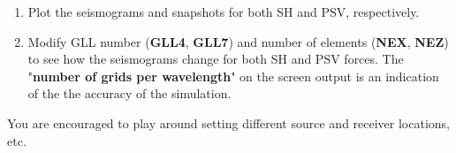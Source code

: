 \documentclass[11pt,titlepage,fleqn]{article}
\begin{document}
\begin{enumerate}

\item Plot the seismograms and snapshots for both SH and PSV, respectively.

\item Modify GLL number ({\bf GLL4}, {\bf GLL7}) and number of elements ({\bf NEX}, {\bf NEZ}) to see how the seismograms change for both SH and
PSV forces. The "{\bf number of grids per wavelength}" on the screen output is an indication of the the accuracy of the simulation.
        
\end{enumerate}

You are encouraged to play around setting different source and receiver locations, etc.
\end{document}
